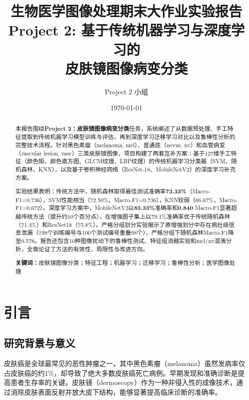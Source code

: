 \documentclass[UTF8,a4paper,12pt]{ctexart}
\title{\textbf{生物医学图像处理期末大作业实验报告 \\[6pt]
        \large Project 2: 基于传统机器学习与深度学习的 \\ 皮肤镜图像病变分类}}
\author{Project 2 小组}
\date{\today}
\numberwithin{figure}{section}
\numberwithin{table}{section}
\begin{document}
\maketitle
\thispagestyle{empty}

\begin{abstract}
\noindent 本报告围绕\textbf{Project 2：皮肤镜图像病变分类}任务，系统阐述了从数据预处理、手工特征提取到传统机器学习模型训练与评估，再到深度学习迁移学习对比以及鲁棒性分析的完整技术流程。针对黑色素瘤（melanoma, mel）、普通痣（nevus, nv）和血管病变（vascular lesion, vasc）三类皮肤镜图像，项目构建了两套互补方案：基于127维手工特征（颜色矩、颜色直方图、GLCM纹理、LBP纹理）的传统机器学习分类器（SVM、随机森林、KNN），以及基于卷积神经网络（ResNet-18、MobileNetV2）的深度学习补充方案。

\noindent 实验结果表明：传统方法中，随机森林取得最佳测试准确率\textbf{73.33\%}（Macro-F1=0.736），SVM性能相当（72.50\%，Macro-F1=0.736），KNN较弱（66.67\%，Macro-F1=0.672）。深度学习方案中，MobileNetV2以\textbf{83.33\%}准确率和\textbf{0.840} Macro-F1显著超越传统方法（提升约10个百分点），在增强图子集上以79.1\%准确率优于传统随机森林（71.4\%）和ResNet18（75.8\%）。严格分组划分实验揭示了原增强划分中存在病灶级信息泄漏（198个训练编号与100个测试编号重叠98个），严格分组下随机森林Macro-F1降至0.578。报告还包含10种图像扰动下的鲁棒性测试、特征组消融实验和mel/nv混淆分析，全面论证了方法的有效性、局限性与改进方向。

\vspace{12pt}
\noindent\textbf{关键词：}皮肤镜图像分类；特征工程；机器学习；迁移学习；鲁棒性分析；医学图像处理
\end{abstract}

\newpage

\tableofcontents
\newpage

\section{引言}

\subsection{研究背景与意义}

皮肤癌是全球最常见的恶性肿瘤之一，其中黑色素瘤（melanoma）虽然发病率仅占皮肤癌的约1\%，却导致了绝大多数皮肤癌死亡病例。早期发现和准确诊断是提高患者生存率的关键。皮肤镜（dermoscopy）作为一种非侵入性的成像技术，通过消除皮肤表面反射并放大皮下结构，能够显著提高临床诊断的准确率。
\end{document}
